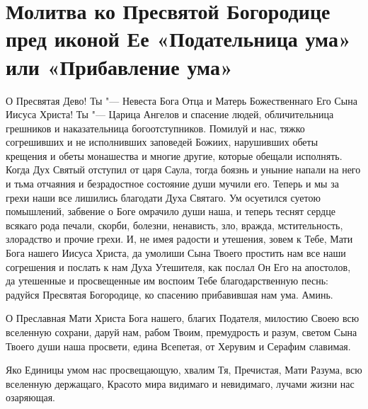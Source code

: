 \mychapterending





\section{Молитва ко Пресвятой Богородице пред иконой Ее «Подательница ума» или «Прибавление ума»}\begin{mymulticols}


О Пресвятая Дево! Ты "--- Невеста Бога Отца и Матерь Божественнаго Его Сына Иисуса Христа! Ты "--- Царица Ангелов и спасение людей, обличительница грешников и наказательница богоотступников. Помилуй и нас, тяжко согрешивших и не исполнивших заповедей Божиих, нарушивших обеты крещения и обеты монашества и многие другие, которые обещали исполнять. Когда Дух Святый отступил от царя Саула, тогда боязнь и уныние напали на него и тьма отчаяния и безрадостное состояние души мучили его. Теперь и мы за грехи наши все лишились благодати Духа Святаго. Ум осуетился суетою помышлений, забвение о Боге омрачило души наша, и теперь теснят сердце всякаго рода печали, скорби, болезни, ненависть, зло, вражда, мстительность, злорадство и прочие грехи. И, не имея радости и утешения, зовем к Тебе, Мати Бога нашего Иисуса Христа, да умолиши Сына Твоего простить нам все наши согрешения и послать к нам Духа Утешителя, как послал Он Его на апостолов, да утешенные и просвещенные им воспоим Тебе благодарственную песнь: радуйся Пресвятая Богородице, ко спасению прибавившая нам ума. Аминь.



О Преславная Мати Христа Бога нашего, благих Подателя, милостию Своею всю вселенную сохрани, даруй нам, рабом Твоим, премудрость и разум, светом Сына Твоего души наша просвети, едина Всепетая, от Херувим и Серафим славимая.



Яко Единицы умом нас просвещающую, хвалим Тя, Пречистая, Мати Разума, всю вселенную держащаго, Красото мира видимаго и невидимаго, лучами жизни нас озаряющая.

\end{mymulticols}

